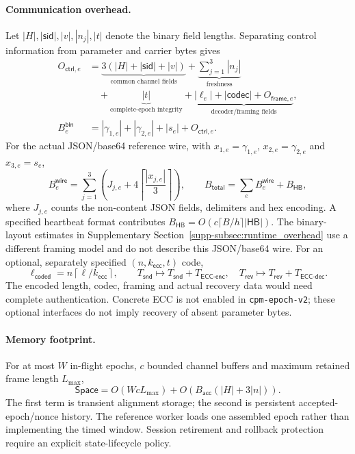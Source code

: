 \documentclass[pdflatex,sn-mathphys-num]{sn-jnl}%
\theoremstyle{definition}
\theoremstyle{game}
\theoremstyle{thmstyleone}%
\theoremstyle{thmstyletwo}%
\theoremstyle{thmstylethree}%
\begin{document}
\paragraph{Communication overhead.}
Let $|H|,|\mathsf{sid}|,|v|,|n_j|,|t|$ denote the binary field lengths.
Separating control information from parameter and carrier bytes gives
\[
\begin{aligned}
O_{\mathsf{ctrl},e}
 &=\underbrace{3(|H|+|\mathsf{sid}|+|v|)}_{\text{common channel fields}}
 +\underbrace{\sum_{j=1}^{3}|n_j|}_{\text{freshness}}\\
 &\quad+\underbrace{|t|}_{\text{complete-epoch integrity}}
 +\underbrace{|\ell_e|+|\mathsf{codec}|+O_{\mathsf{frame},e}}_{\text{decoder/framing fields}},\\
B^{\mathsf{bin}}_e
 &=|\gamma_{1,e}|+|\gamma_{2,e}|+|s_e|+O_{\mathsf{ctrl},e}.
\end{aligned}
\]
For the actual JSON/base64 reference wire, with $x_{1,e}=\gamma_{1,e}$,
$x_{2,e}=\gamma_{2,e}$ and $x_{3,e}=s_e$,
\[
B^{\mathsf{wire}}_e=\sum_{j=1}^{3}
\left(J_{j,e}+4\left\lceil\frac{|x_{j,e}|}{3}\right\rceil\right),
\qquad
B_{\mathsf{total}}=\sum_e B^{\mathsf{wire}}_e+B_{\mathsf{HB}},
\]
where $J_{j,e}$ counts the non-content JSON fields, delimiters and hex
encoding. A specified heartbeat format contributes
$B_{\mathsf{HB}}=O(c\lceil B/h\rceil|\mathsf{HB}|)$.
The binary-layout estimates in Supplementary
Section~\ref{supp-subsec:runtime_overhead} use a different framing model
and do not describe this JSON/base64 wire.
For an optional, separately specified $(n,k_{\mathsf{ecc}},t)$ code,
\[
\ell_{\mathsf{coded}}=n\left\lceil\ell/k_{\mathsf{ecc}}\right\rceil,
\qquad
T_{\mathsf{snd}}\mapsto T_{\mathsf{snd}}+T_{\mathsf{ECC\text{-}enc}},
\quad T_{\mathsf{rev}}\mapsto T_{\mathsf{rev}}+T_{\mathsf{ECC\text{-}dec}}.
\]
The encoded length, codec, framing and actual recovery data would need
complete authentication. Concrete ECC is not enabled in \texttt{cpm-epoch-v2};
these optional interfaces do not imply recovery of absent parameter bytes.

\paragraph{Memory footprint.}
For at most $W$ in-flight epochs, $c$ bounded channel buffers and maximum
retained frame length $L_{\max}$,
\[
\mathsf{Space}=O(WcL_{\max})+
O\!\left(B_{\mathsf{acc}}(|H|+3|n|)\right).
\]
The first term is transient alignment storage; the second is persistent
accepted-epoch/nonce history. The reference worker loads one assembled
epoch rather than implementing the timed window. Session retirement and
rollback protection require an explicit state-lifecycle policy.
\end{document}
